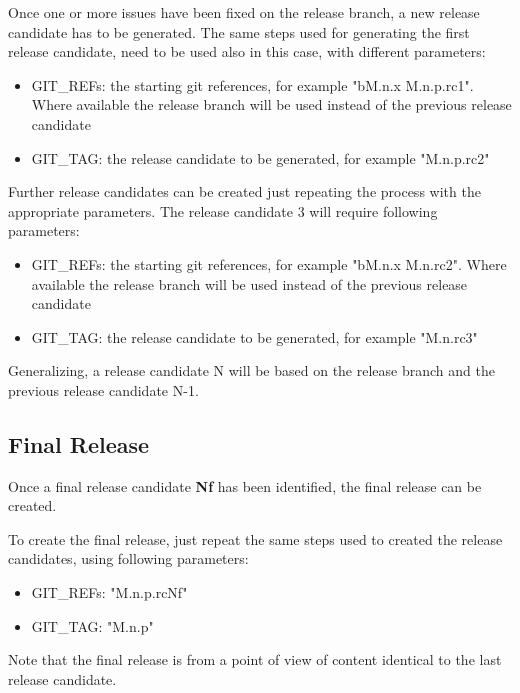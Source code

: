 Once one or more issues have been fixed on the release branch, a new release candidate has to be generated. %
The same steps used for generating the first release candidate, need to be used also in this case, with different parameters:

\begin{itemize}
\item GIT\_REFs: the starting git references, for example "bM.n.x M.n.p.rc1". Where available the release branch will be used instead of the previous release candidate
\item GIT\_TAG: the release candidate to be generated, for example "M.n.p.rc2"
\end{itemize}

Further release candidates can be created just repeating the process with the appropriate parameters.
The release candidate 3 will require following parameters:

\begin{itemize}
\item GIT\_REFs: the starting git references, for example "bM.n.x M.n.rc2". Where available the release branch will be used instead of the previous release candidate
\item GIT\_TAG: the release candidate to be generated, for example "M.n.rc3"
\end{itemize}

Generalizing, a release candidate N will be based on the release branch and the previous release candidate N-1.
 

\subsection{Final Release} \label{sec:finalrelease}

Once a final release candidate \textbf{Nf} has been identified, the final release can be created.

To create the final release, just repeat the same steps used to created the release candidates, using following parameters:

\begin{itemize}
\item GIT\_REFs: "M.n.p.rcNf"
\item GIT\_TAG: "M.n.p"
\end{itemize}

Note that the final release is from a point of view of content identical to the last release candidate.

